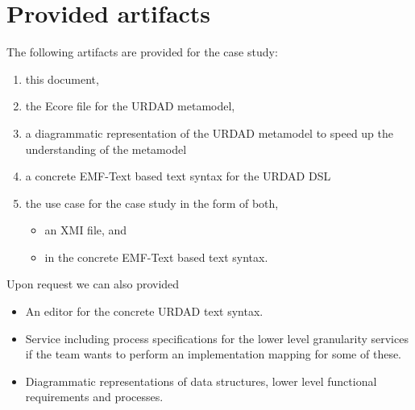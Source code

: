 \section{Provided artifacts}

The following artifacts are provided for the case study:
\begin{enumerate}
  \item this document,
  \item the Ecore file for the URDAD metamodel,
  \item a diagrammatic representation of the URDAD metamodel to speed up the understanding of the metamodel
  \item a concrete EMF-Text based text syntax for the URDAD DSL
  \item the use case for the case study in the form of both, 
    \begin{itemize}
     \item an XMI file, and
     \item in the concrete EMF-Text based text syntax.
    \end{itemize}
\end{enumerate}

Upon request we can also provided
\begin{itemize}
  \item An editor for the concrete URDAD text syntax.
  \item Service including process specifications for the lower level granularity services if the team wants to perform an implementation mapping for some of these.
  \item Diagrammatic representations of data structures, lower level functional requirements and processes.
\end{itemize}


